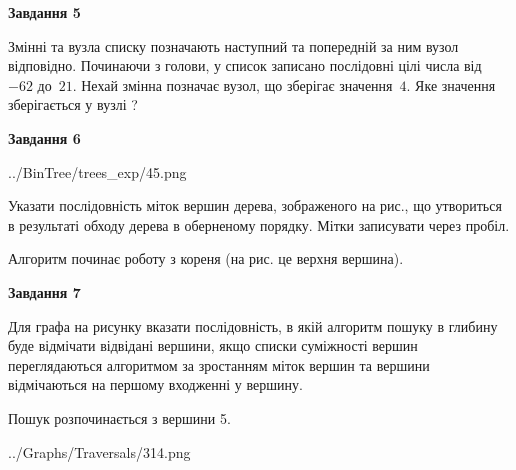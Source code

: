 \documentclass[12pt, ukrainian]{article}
\begin{document}
{\begin {large}
{\begin {center}\textbf{Завдання 5}\end {center}}\par
Змінні  та  вузла списку позначають наступний та попередній за ним вузол відповідно. Починаючи з голови, у список записано послідовні цілі числа від~$-62$ до~$21$. Нехай змінна  позначає вузол, що зберігає значення~$4$.
Яке значення зберігається у вузлі  ?\par
\newpage

{\begin {center}\textbf{Завдання 6}\end {center}}\par

\begin{center}
	{../BinTree/trees_exp/45.png}
\end{center}
Указати послідовність міток вершин дерева, зображеного на рис., що утвориться в результаті обходу дерева в оберненому порядку. Мітки записувати через пробіл.\par Алгоритм починає роботу з кореня (на рис. це верхня вершина).\par
\newpage

{\begin {center}\textbf{Завдання 7}\end {center}}\par
Для графа на рисунку вказати послідовність, в якій алгоритм пошуку в глибину буде відмічати відвідані вершини, якщо списки суміжності вершин переглядаються алгоритмом за зростанням міток вершин та вершини відмічаються на першому вход\-женні у вершину.\par
Пошук розпочинається з вершини 5.\par

\begin{center}
	{../Graphs/Traversals/314.png}
\end{center}\par
\newpage


\end{large}}
\end{document}
